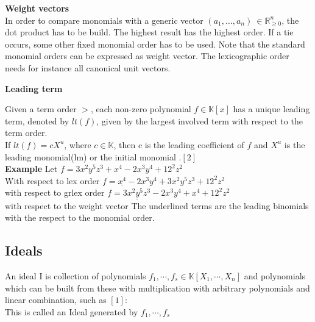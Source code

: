 \textbf{Weight vectors} \\
In order to compare monomials with a generic vector $\left({a}_{1},\dots ,{a}_{n}\right)~\in \mathbb{R}^{n}_{\geq 0}$, the dot product has to be build. The highest result has the highest order. If a tie occurs, some other fixed monomial order has to be used. Note that the standard monomial orders can be expressed as weight vector. The lexicographic order needs for instance all canonical unit vectors.

\textbf{Leading term}

Given a term order $>$, each non-zero polynomial $f \in \mathbb{K}\left[ x\right] $ has a unique leading term, denoted by $lt(f)$, given by the largest involved term with respect to the term order.\\
If $lt(f) = cX^{u}$, where $c \in \mathbb{K}$, then c is the leading coefficient of $f$ and $X^{u}$ is the leading monomial(lm) or the initial monomial .$\left[ 2\right]$\\

\textbf{Example} Let $ f = 3x^{2}y^{5}z^{3} + x^{4} -2x^{3}y^{4} + 12^{2}z^{2}$ \\
With respect to lex order $f = \underline{x^{4}} -2x^{3}y^{4} + 3x^{2}y^{5}z^{3} + 12^{2}z^{2} $ \\
with respect to grlex order $f = \underline{3x^{2}y^{5}z^{3}} -2x^{3}y^{4} + x^{4}+ 12^{2}z^{2}$  \\
with respect to the weight vector 
The underlined terms are the leading binomials with the respect to the monomial order.


\subsection{Ideals}

\begin{env_definition}[Ideal]
An ideal I is collection of polynomials $f_{1}, \cdots , f_{s} \in \mathbb{K}\left[X_{1}, \cdots, X_{n}\right] $ and polynomials which can be built from these with multiplication with arbitrary polynomials and linear combination, such as $\left[1 \right]  $: \\
This is called an Ideal generated by $f_{1}, \cdots , f_{s}$ \\
\end{env_definition}

